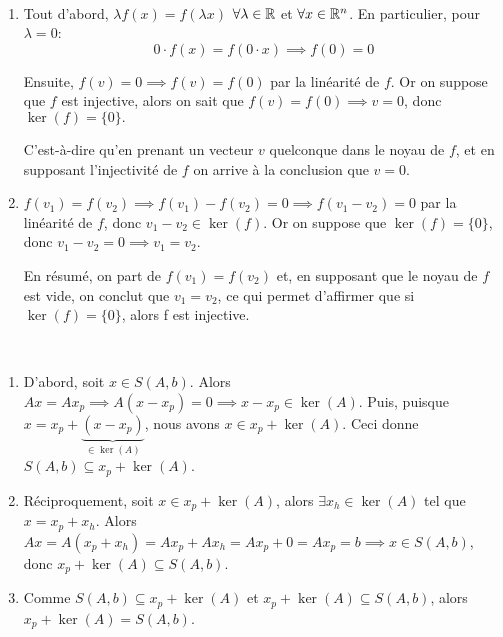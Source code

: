 \begin{exercice}
\,
\begin{enumerate}
    \item Tout d'abord, $\lambda f(x) = f(\lambda x)$ $\forall \lambda \in \mathbb{R}$ et $\forall x \in \mathbb{R}^n$. En particulier, pour $\lambda = 0$:
    $$0 \cdot f(x) = f(0 \cdot x) \implies f(0) = 0$$
    
    Ensuite, $f(v)=0 \implies f(v) = f(0)$ par la linéarité de $f$. Or on suppose que $f$ est injective, alors on sait que $f(v) = f(0) \implies v = 0$, donc $\ker(f) = \{0\}.$

    C'est-à-dire qu'en prenant un vecteur $v$ quelconque dans le noyau de $f$, et en supposant l'injectivité de $f$ on arrive à la conclusion que $v = 0$.
    
    \item $f(v_1) = f(v_2) \implies f(v_1) - f(v_2) = 0 \implies f(v_1 - v_2) = 0 $ par la linéarité de $f$, donc $v_1-v_2 \in \ker(f)$. Or on suppose que $\ker(f) = \{0\}$, donc $v_1 - v_2 = 0 \implies v_1 = v_2$. 
    
    En résumé, on part de $f(v_1) = f(v_2)$ et, en supposant que le noyau de $f$ est vide, on conclut que $v_1 = v_2$, ce qui permet d'affirmer que si $\ker(f)=\{0\}$, alors f est injective. \\
\end{enumerate}
\end{exercice}

\begin{exercice}
\,
\begin{enumerate}
    \item D'abord, soit $x \in S(A,b)$. Alors $Ax = Ax_p \implies A(x-x_p) = 0 \implies x-x_p \in \ker(A)$. Puis, puisque $x = x_p + \underbrace{(x-x_p)}_{\in \ker(A)}$, nous avons $x \in x_p + \ker(A)$. Ceci donne $S(A,b) \subseteq x_p + \ker(A)$.
    \item Réciproquement, soit $x \in x_p + \ker(A)$, alors $\exists x_h \in \ker(A)$ tel que $x = x_p + x_h$. Alors $Ax = A(x_p + x_h) = Ax_p + Ax_h = Ax_p + 0 = Ax_p=b \implies x \in S(A,b)$, donc $x_p + \ker(A) \subseteq S(A,b)$.
    \item Comme $S(A,b) \subseteq x_p + \ker(A)$ et $x_p + \ker(A) \subseteq S(A,b)$, alors $x_p + \ker(A) = S(A,b)$. \\
\end{enumerate}
\end{exercice}

